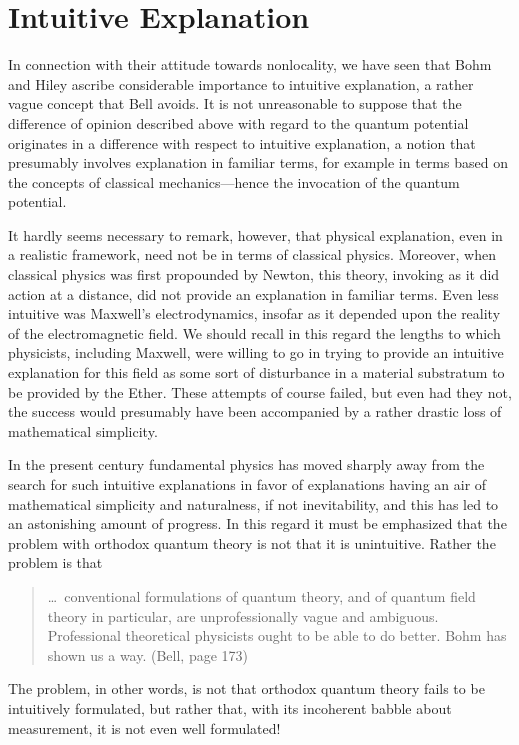 \documentclass[12pt]{article}
\newcommand\bq{\begin{quotation}}
\newcommand\eq{\end{quotation}}
\begin{document}
\section{Intuitive Explanation}

In connection with their attitude towards nonlocality, we have seen that
Bohm and Hiley ascribe considerable importance to intuitive explanation, a
rather vague concept that Bell avoids. It is not unreasonable to suppose
that the difference of opinion described above with regard to the quantum
potential originates in a difference with respect to intuitive
explanation, a notion that presumably involves explanation in familiar
terms, for example in terms based on the concepts of classical
mechanics---hence the invocation of the quantum potential.

It hardly seems necessary to remark, however, that physical explanation,
even in a realistic framework, need not be in terms of classical physics.
Moreover, when classical physics was first propounded by Newton, this
theory, invoking as it did action at a distance, did not provide an
explanation in familiar terms. Even less intuitive was Maxwell's
electrodynamics, insofar as it depended upon the reality of the
electromagnetic field. We should recall in this regard the lengths to which
physicists, including Maxwell, were willing to go in trying to provide an
intuitive explanation for this field as some sort of disturbance in a
material substratum to be provided by the Ether. These attempts of course
failed, but even had they not, the success would presumably have been
accompanied by a rather drastic loss of mathematical simplicity.

In the present century fundamental physics has moved sharply away from the
search for such intuitive explanations in favor of explanations having an
air of mathematical simplicity and naturalness, if not inevitability, and
this has led to an astonishing amount of progress. In this regard it must
be emphasized that the problem with orthodox quantum theory is not that it
is unintuitive. Rather the problem is that

\bq \noindent \dots\  conventional formulations of quantum theory, and of
quantum field theory in particular, are unprofessionally vague and
ambiguous. Professional theoretical physicists ought to be able to do
better. Bohm has shown us a way. (Bell, page 173)
\eq
The problem, in other words, is not that orthodox quantum theory fails to be
intuitively formulated, but rather that, with its incoherent babble about
measurement,  it  is not even  well formulated!
\end{document}
